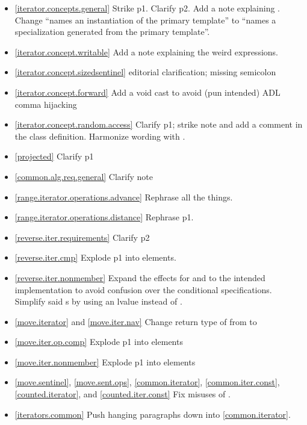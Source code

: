 \begin{itemize}
\item \ref{iterator.concepts.general} Strike p1. Clarify p2.
  Add a note explaining .
  Change ``names an instantiation of the primary template'' to
  ``names a specialization generated from the primary template''.
\item \ref{iterator.concept.writable} Add a note explaining the weird
   expressions.
\item \ref{iterator.concept.sizedsentinel} editorial clarification;
  missing semicolon
\item \ref{iterator.concept.forward} Add a void cast to avoid (pun intended) ADL
  comma hijacking
\item \ref{iterator.concept.random.access} Clarify p1; strike note and add a
   comment in the class definition. Harmonize wording with
  .
\item \ref{projected} Clarify p1
\item \ref{common.alg.req.general} Clarify note
\item \ref{range.iterator.operations.advance} Rephrase all the things.
\item \ref{range.iterator.operations.distance} Rephrase p1.
\item \ref{reverse.iter.requirements} Clarify p2
\item \ref{reverse.iter.cmp} Explode p1 into \constraints elements.
\item \ref{reverse.iter.nonmember} Expand the effects for  and
   to the intended implementation to avoid confusion over the
  conditional  specifications. Simplify said s
  by using an lvalue  instead of .
\item \ref{move.iterator} and \ref{move.iter.nav} Change return type of
   from  to 
\item \ref{move.iter.op.comp} Explode p1 into \constraints elements
\item \ref{move.iter.nonmember} Explode p1 into \constraints elements
\item \ref{move.sentinel}, \ref{move.sent.ops}, \ref{common.iterator},
  \ref{common.iter.const}, \ref{counted.iterator},
  and \ref{counted.iter.const} Fix misuses of .
\item \ref{iterators.common} Push hanging paragraphs down
  into \ref{common.iterator}.

\end{itemize}
